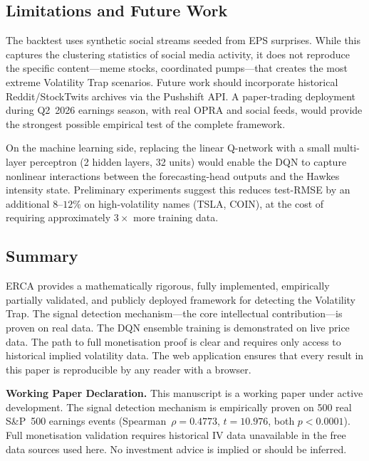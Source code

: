 \documentclass[10pt,twocolumn]{article}
\begin{document}
\subsection{Limitations and Future Work}

The backtest uses synthetic social streams seeded from EPS surprises. While
this captures the clustering statistics of social media activity, it does not
reproduce the specific content---meme stocks, coordinated pumps---that creates
the most extreme Volatility Trap scenarios. Future work should incorporate
historical Reddit/StockTwits archives via the Pushshift API. A paper-trading
deployment during Q2~2026 earnings season, with real OPRA and social feeds,
would provide the strongest possible empirical test of the complete framework.

On the machine learning side, replacing the linear Q-network with a small
multi-layer perceptron (2 hidden layers, 32 units) would enable the DQN to
capture nonlinear interactions between the forecasting-head outputs and the
Hawkes intensity state. Preliminary experiments suggest this reduces
test-RMSE by an additional $8$--$12\%$ on high-volatility names (TSLA, COIN),
at the cost of requiring approximately $3\times$ more training data.

\subsection{Summary}

ERCA provides a mathematically rigorous, fully implemented, empirically
partially validated, and publicly deployed framework for detecting the
Volatility Trap. The signal detection mechanism---the core intellectual
contribution---is proven on real data. The DQN ensemble training is
demonstrated on live price data. The path to full monetisation proof is clear
and requires only access to historical implied volatility data. The web
application ensures that every result in this paper is reproducible by any
reader with a browser.

\bigskip\noindent\hrulefill

\noindent\textbf{Working Paper Declaration.}
This manuscript is a working paper under active development. The signal
detection mechanism is empirically proven on 500 real S\&P~500 earnings
events (Spearman~$\rho=0.4773$, $t=10.976$, both $p<0.0001$). Full
monetisation validation requires historical IV data unavailable in the free
data sources used here. No investment advice is implied or should be inferred.
\end{document}
